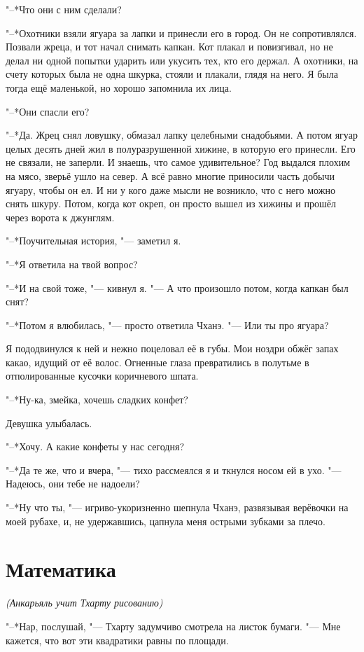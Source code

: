 \documentclass[a4paper,10pt]{book}
\begin{document}
"--*Что они с ним сделали?

"--*Охотники взяли ягуара за лапки и принесли его в город. Он не 
сопротивлялся. Позвали жреца, и тот начал снимать капкан. Кот плакал и 
повизгивал, но не делал ни одной попытки ударить или укусить тех, кто его 
держал. А охотники, на счету которых была не одна шкурка, стояли и плакали, 
глядя на него. Я была тогда ещё маленькой, но хорошо запомнила их лица.

"--*Они спасли его?

"--*Да. Жрец снял ловушку, обмазал лапку целебными снадобьями. А потом ягуар 
целых десять дней жил в полуразрушенной хижине, в которую его принесли. Его не 
связали, не заперли. И знаешь, что самое удивительное? Год выдался плохим на 
мясо, зверьё ушло на север. А всё равно многие приносили часть добычи ягуару, 
чтобы он ел. И ни у кого даже мысли не возникло, что с него можно снять шкуру. 
Потом, когда кот окреп, он просто вышел из хижины и прошёл через ворота к 
джунглям.

"--*Поучительная история, "--- заметил я.

"--*Я ответила на твой вопрос?

"--*И на свой тоже, "--- кивнул я. "--- А что произошло потом, когда капкан был 
снят?

"--*Потом я влюбилась, "--- просто ответила Чханэ. "--- Или ты про ягуара?

Я пододвинулся к ней и нежно поцеловал её в губы. Мои ноздри обжёг запах какао, 
идущий от её волос. Огненные глаза превратились в полутьме в отполированные 
кусочки коричневого шпата.

"--*Ну-ка, змейка, хочешь сладких конфет?

Девушка улыбалась.

"--*Хочу. А какие конфеты у нас сегодня?

"--*Да те же, что и вчера, "--- тихо рассмеялся я и ткнулся носом ей в ухо. 
"--- 
Надеюсь, они тебе не надоели?

"--*Ну что ты, "--- игриво-укоризненно шепнула Чханэ, развязывая верёвочки на 
моей рубахе, и, не удержавшись, цапнула меня острыми зубками за плечо.

\section{Математика}

\textit{(Анкарьяль учит Тхарту рисованию)}

"--*Нар, послушай, "--- Тхарту задумчиво смотрела на листок бумаги. "--- Мне 
кажется, что вот эти квадратики равны по площади.
\end{document}
